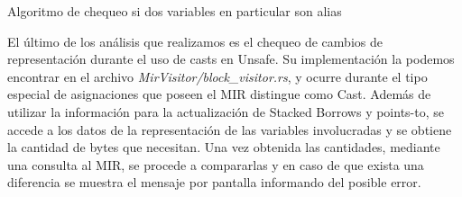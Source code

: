\begin{algorithm}
    \caption{Algoritmo de chequeo si dos variables en particular son alias}
    \DontPrintSemicolon
\end{algorithm}

El último de los análisis que realizamos es el chequeo de cambios de representación durante el uso de casts en Unsafe. Su implementación la podemos encontrar en el archivo \textit{MirVisitor/block\_visitor.rs}, y ocurre durante el tipo especial de asignaciones que poseen el MIR distingue como Cast. Además de utilizar la información para la actualización de Stacked Borrows y points-to, se accede a los datos de la representación de las variables involucradas y se obtiene la cantidad de bytes que necesitan. Una vez obtenida las cantidades, mediante una consulta al MIR, se procede a compararlas y en caso de que exista una diferencia se muestra el mensaje por pantalla informando del posible error.
